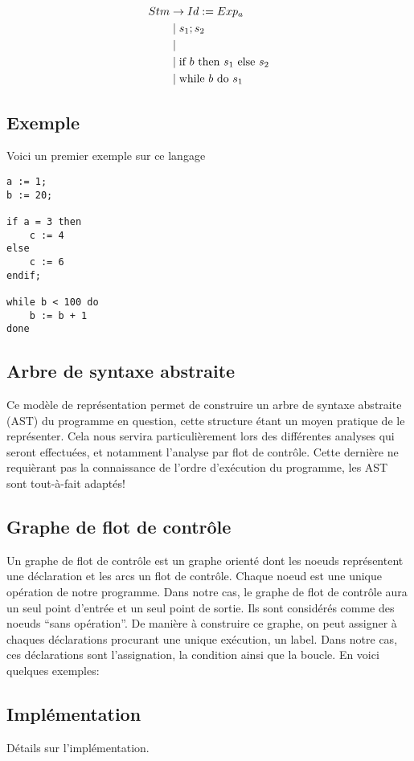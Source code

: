 \begin{align*}
Stm & \rightarrow Id := Exp_a \\
  & \mid s_1 \space;\space s_2 \\
  & \mid \\
  & \mid \text{if } b \text{ then } s_1 \text{ else } s_2 \\
  & \mid \text{while } b \text{ do } s_1
\end{align*}

\subsection{Exemple}
Voici un premier exemple sur ce langage
\begin{lstlisting}
a := 1;
b := 20;

if a = 3 then
	c := 4
else
	c := 6
endif;

while b < 100 do
	b := b + 1
done
\end{lstlisting}

\subsection{Arbre de syntaxe abstraite}
Ce modèle de représentation permet de construire un arbre de syntaxe abstraite (AST) du programme en question, 
cette structure étant un moyen pratique de le représenter. Cela nous servira particulièrement lors des différentes 
analyses qui seront effectuées, et notamment l'analyse par flot de contrôle. Cette dernière ne requièrant pas 
la connaissance de l'ordre d'exécution du programme, les AST sont tout-à-fait adaptés!



\subsection{Graphe de flot de contrôle}
Un graphe de flot de contrôle est un graphe orienté dont les noeuds représentent une déclaration et les arcs un 
flot de contrôle. Chaque noeud est une unique opération de notre programme. Dans notre cas, le graphe de flot de 
contrôle aura un seul point d'entrée et un seul point de sortie. Ils sont considérés comme des noeuds ``sans opération''. 
De manière à construire ce graphe, on peut assigner à chaques déclarations procurant une unique exécution, un label. 
Dans notre cas, ces déclarations sont l'assignation, la condition ainsi que la boucle. En voici quelques exemples:

\begin{center}\end{center}

\subsection{Implémentation}
Détails sur l'implémentation.